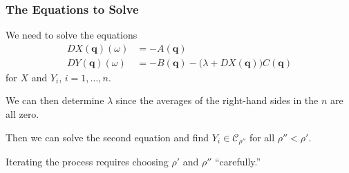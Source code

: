 \documentclass{beamer}
\newcommand{\bp}[1]{\bm{#1}}
\begin{document}
\begin{frame}
  \frametitle{The Equations to Solve}
  We need to solve the equations
  \begin{align*}
    DX(\bp{q})(\omega) &= -A(\bp{q})\\
    DY(\bp{q})(\omega) &= -B(\bp{q}) - \big( \lambda + DX(\bp{q}) \big)
                C(\bp{q})
  \end{align*}
  for $X$ and $Y_i$, $i = 1, \ldots, n$.

  We can then determine $\lambda$ since the averages of the right-hand sides in
  the $n$ are all zero.

  Then we can solve the second equation and find $Y_i \in \mathcal{C}_{\rho''}$
  for all $\rho'' < \rho'$.
  
  Iterating the process requires choosing $\rho'$ and $\rho''$ ``carefully.''
\end{frame}
\end{document}
